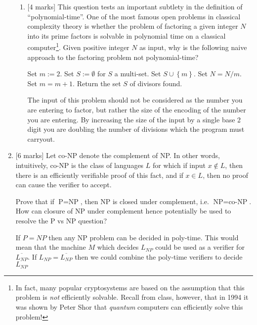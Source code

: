 \documentclass{article}
\newcommand{\class}[1]{\text{#1}}
\newcommand{\set}[1]{{\left\{#1\right\}}}    %
\begin{document}
\begin{enumerate}
\begin{enumerate}
        \item {[4 marks]} This question tests an important subtlety in the definition of ``polynomial-time''.
             One of the most famous open problems in classical complexity theory is whether the problem of factoring a given integer $N$ into its prime factors is solvable in polynomial time on a classical computer\footnote{In fact, many popular cryptosystems are based on the assumption that this problem is \emph{not} efficiently solvable. Recall from class, however, that in 1994 it was shown by Peter Shor that \emph{quantum} computers can efficiently solve this problem!}. Given positive integer $N$ as input, why is the following naive approach to the factoring problem not polynomial-time?
                \begin{algorithmic}[1]
            \State Set $m := 2$.
            \State Set $S := \emptyset$ for $S$ a multi-set.
                    \State Set $S\cup \set{m}$.
                    \State Set $N=N/m$.
                \Else
                    \State Set $m=m+1$.
                \EndIf
            \EndWhile
            \State Return the set $S$ of divisors found.
\end{algorithmic}
The input of this problem should not be considered as the number you are entering to factor, but rather the size of the encoding of the number you are entering. By increasing the size of the input by a single base 2 digit you are doubling the number of divisions which the program must carryout. 
    \end{enumerate}
    \item {[6 marks]} 
          Let co-NP denote the complement of NP. In other words, intuitively, co-NP is the class of languages $L$ for which if input $x\not\in L$, then there is an efficiently verifiable proof of this fact, and if $x\in L$, then no proof can cause the verifier to accept.
            
            Prove that if $\class{P}=\class{NP}$, then NP is closed under complement, i.e. $\class{NP}=\class{co-NP}$. How can closure of NP under complement hence potentially be used to resolve the P vs NP question?

If $P=NP$ then any NP problem can be decided in poly-time. This would mean that the machine $M$ which decides $L_{NP}$ could be used as a verifier for $\overline{L_{NP}}$. If $L_{NP} = \overline{L_{NP}}$ then we could combine the poly-time verifiers to decide $L_{NP}$      
    

\end{enumerate}
\end{document}
